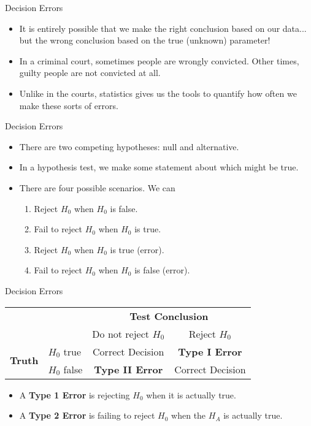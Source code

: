 \begin{frame}{Decision Errors}
    \begin{itemize}
        \item It is entirely possible that we make the right conclusion based on our data... but the wrong conclusion based on the true (unknown) parameter!
        \item In a criminal court, sometimes people are wrongly convicted. Other times, guilty people are not convicted at all.
        \item Unlike in the courts, statistics gives us the tools to quantify how often we make these sorts of errors.
    \end{itemize}
\end{frame}

\begin{frame}{Decision Errors}
    \begin{itemize}
        \item There are two competing hypotheses: null and alternative.
        \item In a hypothesis test, we make some statement about which might be true.
        \item There are four possible scenarios. We can
        \begin{enumerate}
            \item Reject $H_0$ when $H_0$ is false.
            \item Fail to reject $H_0$ when $H_0$ is true.
            \item Reject $H_0$ when $H_0$ is true (error).
            \item Fail to reject $H_0$ when $H_0$ is false (error).
        \end{enumerate}
    \end{itemize}
    
\end{frame}

\begin{frame}{Decision Errors}
    \begin{center}
        \begin{tabular}{llcc}
             & & \multicolumn{2}{c}{\textbf{Test Conclusion}} \\ \cline{3-4} 
             & & Do not reject $H_0$ & Reject $H_0$ \\ \cline{2-4} 
            \multirow{2}{*}{\textbf{Truth}} 
                & $H_0$ true  & Correct Decision & \textbf{Type I Error} \\     & $H_0$ false & \textbf{Type II Error} & Correct Decision \\ \cline{2-4}
        \end{tabular}
    \end{center}
    \begin{itemize}
        \item A \textbf{Type 1 Error} is rejecting $H_0$ when it is actually true.
        \item A \textbf{Type 2 Error} is failing to reject $H_0$ when the $H_A$ is actually true.
    \end{itemize}
\end{frame}

